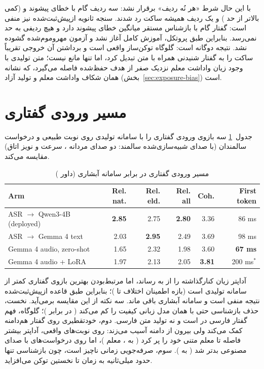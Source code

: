 با این حال شرط «هر نُه ردیف» برقرار نشد: سه ردیف گام  با خطای
پیشوند  و  (کمی بالاتر از حد ) و یک ردیف همیشه ساکت
رد شدند. سنجه ثانویه ازپیش‌ثبت‌شده نیز منفی است: گفتار گام  با
بازشناس مستقر میانگین خطای پیشوند  دارد و هیچ ردیفی به حد 
نمی‌رسد. بنابراین طبق پروتکل، آموزش کامل  آغاز نشد و آزمون
مهروموم‌شده گشوده نشد. نتیجه دوگانه است: گلوگاه توکن‌ساز واقعی است و برداشتن
آن خروجی تقریباً ساکت را به گفتار شنیدنی همراه با متن تبدیل کرد، اما تنها
مانع نیست؛ متن تولیدی با وجود زیان واداشت معلم نزدیک صفر از هدف حفظ‌شده
فاصله می‌گیرد، که نشانه همان شکاف واداشت معلم و تولید آزاد
(بخش~\ref{sec:exposure-bias}) است.

\section{مسیر ورودی گفتاری}
\label{sec:res-speechin}

جدول~\ref{tab:speechin} سه بازوی ورودی گفتاری را با سامانه تولیدی روی
 نوبت طبیعی و  درخواست سالمندان (با صدای شبیه‌سازی‌شده سالمند:
دو صدای مردانه ، سرعت  و نویز اتاق) مقایسه می‌کند.

\begin{table}[ht]
\centering
\caption{مسیر ورودی گفتاری در برابر سامانه آبشاری (داور )}
\label{tab:speechin}
\small
\begin{latin}
\begin{tabular}{lrrrrr}
\toprule
Arm & Rel. nat. & Rel. eld. & Rel. all & Coh. & First token \\
\midrule
ASR $\rightarrow$ Qwen3-4B (deployed) & \textbf{2.85} & 2.75 & \textbf{2.80} & 3.36 & 86 ms \\
ASR $\rightarrow$ Gemma 4 text & 2.03 & \textbf{2.95} & 2.49 & 3.69 & 98 ms \\
Gemma 4 audio, zero-shot & 1.65 & 2.32 & 1.98 & 3.60 & \textbf{67 ms} \\
Gemma 4 audio + LoRA & 1.97 & 2.13 & 2.05 & \textbf{3.81} & 200 ms$^{*}$ \\
\bottomrule
\end{tabular}
\end{latin}
\par{}
\end{table}

آداپتر زیان کنارگذاشته را از  به  رساند، اما مرتبط‌بودن
بهترین بازوی گفتاری  کمتر از سامانه تولیدی است (بازه اطمینان اختلاف
 تا )؛ بنابراین طبق قاعده ازپیش‌ثبت‌شده نتیجه منفی است و
سامانه آبشاری باقی ماند. سه نکته از این مقایسه برمی‌آید. نخست، حذف
بازشناسی حتی با همان مدل زبانی کیفیت را کم می‌کند ( در برابر
)؛ گلوگاه، فهم گفتار فارسی در  است و نه تولید متن فارسی.
دوم، خودتقطیری روی گفتار هم‌دامنه کمک می‌کند ولی بیرون از دامنه آسیب می‌زند:
روی نوبت‌های واقعی، آداپتر بیشتر فاصله تا معلم متنی خود را پر کرد
( به ، معلم )، اما روی درخواست‌های با صدای مصنوعی
بدتر شد ( به ). سوم، صرفه‌جویی زمانی ناچیز است، چون
بازشناسی  تنها حدود  میلی‌ثانیه به زمان تا نخستین توکن
می‌افزاید.

